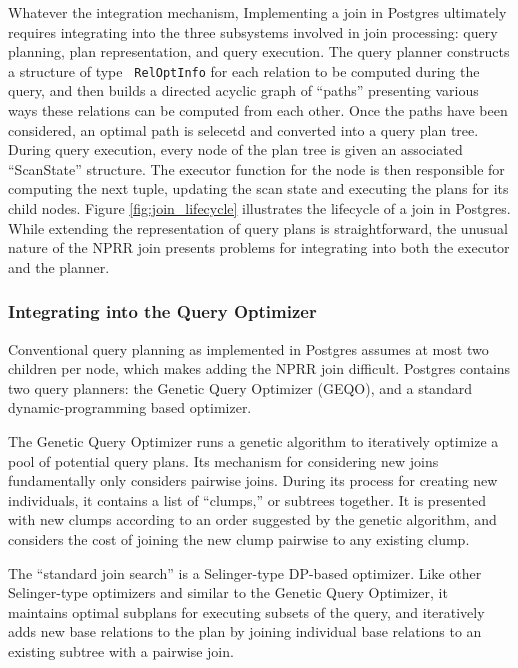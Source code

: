 Whatever the integration mechanism, Implementing a join in Postgres
ultimately requires integrating into the three
subsystems involved in join processing: query planning, plan representation, and query
execution. The query planner constructs a structure of type {\tt
  RelOptInfo} for each relation to be computed during the query, and
then builds a directed acyclic graph of ``paths'' presenting various
ways these relations can be computed from each other. Once the paths
have been considered, an optimal path is selecetd and converted into a
query plan tree. During query execution, every node of the plan tree is
given an associated ``ScanState'' structure. The executor function for
the node is then responsible for computing the next tuple, updating
the scan state and executing the plans for its child nodes. Figure
\ref{fig:join_lifecycle} illustrates the lifecycle of a
join in Postgres. While extending the representation of query plans is
straightforward, the unusual nature of the NPRR join presents problems
for integrating into both the executor and the planner.

\subsubsection{Integrating into the Query Optimizer}

Conventional query planning as implemented in Postgres assumes at most
two children per node, which makes adding the NPRR join difficult. Postgres contains two query planners: the Genetic Query Optimizer
(GEQO), and a standard dynamic-programming based optimizer.

The Genetic Query Optimizer runs a genetic algorithm to iteratively
optimize a pool of potential query plans. Its mechanism for
considering new joins fundamentally only considers pairwise joins. During its process for creating
new individuals, it contains a list of ``clumps,'' or subtrees
together. It is presented with new clumps according to an order suggested by
the genetic algorithm, and considers the cost of joining the new clump pairwise
to any existing clump.

The ``standard join search'' is a Selinger-type DP-based
optimizer. Like other Selinger-type optimizers and similar to the
Genetic Query Optimizer, it maintains optimal subplans for executing
subsets of the query, and iteratively adds new base relations to the
plan by joining individual base relations to an existing subtree with
a pairwise join.

